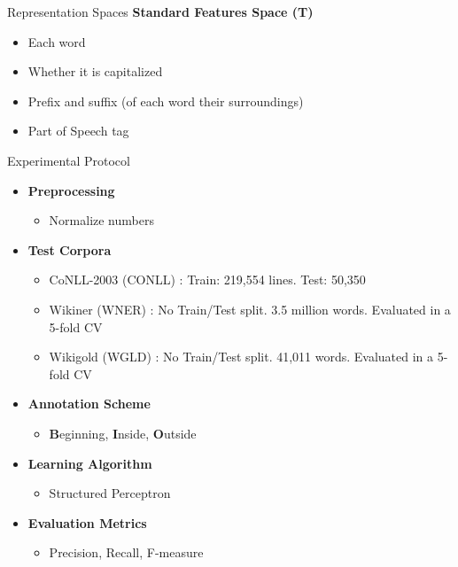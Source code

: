 \documentclass[10pt,xcolor=table]{beamer}
\begin{document}
\begin{frame}{Representation Spaces}
	\large \textbf{Standard Features Space (T)}
	\vspace{1cm}
	\begin{itemize}
		\item Each word
		\item Whether it is capitalized
		\item Prefix and suffix (of each word their surroundings)
		\item Part of Speech tag
	\end{itemize}	 
	\vspace{\textheight}
\end{frame}



\begin{frame}{Experimental Protocol}
	\begin{itemize}
		\item \large \textbf{Preprocessing}
			\begin{itemize}
				\item Normalize numbers
			\end{itemize}
		\item \textbf{Test Corpora}
			\begin{itemize}
			\item CoNLL-2003 (CONLL) \cite{SangM03}: Train: 219,554 lines. Test: 50,350 
			\item Wikiner (WNER) \cite{Nothman2009}: No Train/Test split. 3.5 million words. Evaluated in a 5-fold CV
			\item Wikigold (WGLD) \cite{Balasuriya2009}: No Train/Test split. 41,011 words. Evaluated in a 5-fold CV
			\end{itemize}
		\item \textbf{Annotation Scheme}
			\begin{itemize}
				\item \textbf{B}eginning, \textbf{I}nside, \textbf{O}utside
			\end{itemize}
		\item \textbf{Learning Algorithm}
			\begin{itemize}
				\item Structured Perceptron \cite{Collins2002}
			\end{itemize}

		\item \textbf{Evaluation Metrics}
			\begin{itemize}
				\item Precision, Recall, F-measure
			\end{itemize}
	\end{itemize}	 
	\vspace{\textheight}
\end{frame}
\end{document}
